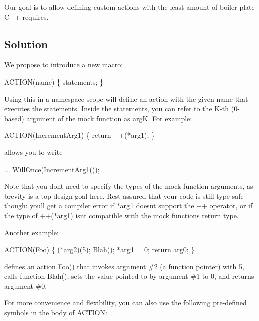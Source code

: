 Our goal is to allow defining custom actions with the least amount of boiler-\/plate C++ requires.

\subsection*{Solution}

We propose to introduce a new macro\+: 
\begin{DoxyCode}
ACTION(name) \{ statements; \}
\end{DoxyCode}


Using this in a namespace scope will define an action with the given name that executes the statements. Inside the statements, you can refer to the K-\/th (0-\/based) argument of the mock function as {\ttfamily argK}. For example\+: 
\begin{DoxyCode}
ACTION(IncrementArg1) \{ return ++(*arg1); \}
\end{DoxyCode}
 allows you to write 
\begin{DoxyCode}
... WillOnce(IncrementArg1());
\end{DoxyCode}


Note that you don\textquotesingle{}t need to specify the types of the mock function arguments, as brevity is a top design goal here. Rest assured that your code is still type-\/safe though\+: you\textquotesingle{}ll get a compiler error if {\ttfamily $\ast$arg1} doesn\textquotesingle{}t support the {\ttfamily ++} operator, or if the type of {\ttfamily ++($\ast$arg1)} isn\textquotesingle{}t compatible with the mock function\textquotesingle{}s return type.

Another example\+: 
\begin{DoxyCode}
ACTION(Foo) \{
  (*arg2)(5);
  Blah();
  *arg1 = 0;
  return arg0;
\}
\end{DoxyCode}
 defines an action {\ttfamily Foo()} that invokes argument \#2 (a function pointer) with 5, calls function {\ttfamily Blah()}, sets the value pointed to by argument \#1 to 0, and returns argument \#0.

For more convenience and flexibility, you can also use the following pre-\/defined symbols in the body of {\ttfamily A\+C\+T\+I\+ON}\+:

